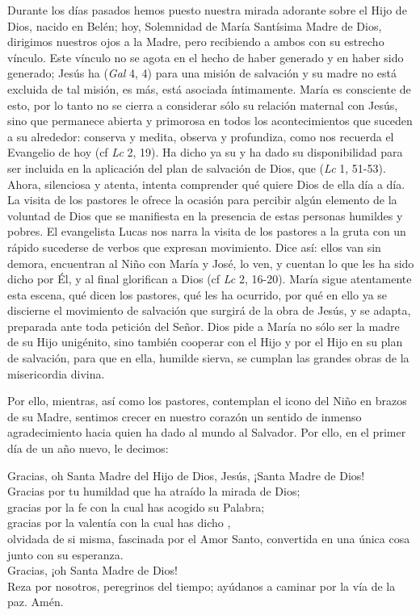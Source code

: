 Durante los días pasados hemos puesto nuestra mirada adorante sobre el Hijo de Dios, nacido en Belén; hoy, Solemnidad de María Santísima Madre de Dios, dirigimos nuestros ojos a la Madre, pero recibiendo a ambos con su estrecho vínculo. Este vínculo no se agota en el hecho de haber generado y en haber sido generado; Jesús ha  (\emph{Gal} 4, 4) para una misión de salvación y su madre no está excluida de tal misión, es más, está asociada íntimamente. María es consciente de esto, por lo tanto no se cierra a considerar sólo su relación maternal con Jesús, sino que permanece abierta y primorosa en todos los acontecimientos que suceden a su alrededor: conserva y medita, observa y profundiza, como nos recuerda el Evangelio de hoy (cf \emph{Lc} 2, 19). Ha dicho ya su  y ha dado su disponibilidad para ser incluida en la aplicación del plan de salvación de Dios, que  (\emph{Lc} 1, 51-53). Ahora, silenciosa y atenta, intenta comprender qué quiere Dios de ella día a día. La visita de los pastores le ofrece la ocasión para percibir algún elemento de la voluntad de Dios que se manifiesta en la presencia de estas personas humildes y pobres. El evangelista Lucas nos narra la visita de los pastores a la gruta con un rápido sucederse de verbos que expresan movimiento. Dice así: ellos van sin demora, encuentran al Niño con María y José, lo ven, y cuentan lo que les ha sido dicho por Él, y al final glorifican a Dios (cf \emph{Lc} 2, 16-20). María sigue atentamente esta escena, qué dicen los pastores, qué les ha ocurrido, por qué en ello ya se discierne el movimiento de salvación que surgirá de la obra de Jesús, y se adapta, preparada ante toda petición del Señor. Dios pide a María no sólo ser la madre de su Hijo unigénito, sino también cooperar con el Hijo y por el Hijo en su plan de salvación, para que en ella, humilde sierva, se cumplan las grandes obras de la misericordia divina.

Por ello, mientras, así como los pastores, contemplan el icono del Niño en brazos de su Madre, sentimos crecer en nuestro corazón un sentido de inmenso agradecimiento hacia quien ha dado al mundo al Salvador. Por ello, en el primer día de un año nuevo, le decimos:

Gracias, oh Santa Madre del Hijo de Dios, Jesús, ¡Santa Madre de Dios!\\ Gracias por tu humildad que ha atraído la mirada de Dios;\\ gracias por la fe con la cual has acogido su Palabra;\\ gracias por la valentía con la cual has dicho ,\\ olvidada de si misma, fascinada por el Amor Santo, convertida en una única cosa junto con su esperanza.\\ Gracias, ¡oh Santa Madre de Dios!\\ Reza por nosotros, peregrinos del tiempo; ayúdanos a caminar por la vía de la paz. Amén.

